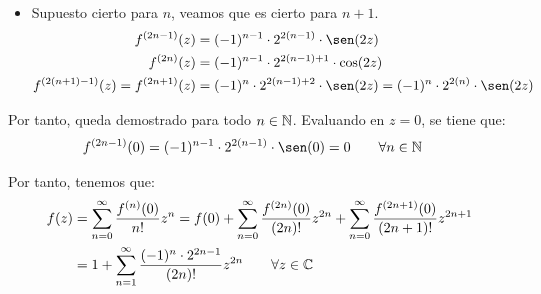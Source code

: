 \begin{ejercicio}
\begin{enumerate}
\begin{itemize}
            \item Supuesto cierto para $n$, veamos que es cierto para $n+1$.
            \begin{align*}
                f^{(2n-1)}(z) &= (-1)^{n-1}\cdot 2^{2(n-1)}\cdot \sen(2z)\\
                f^{(2n)}(z) &= (-1)^{n-1}\cdot 2^{2(n-1)+1}\cdot \cos(2z)\\
                f^{(2(n+1)-1)}(z) = f^{(2n+1)}(z) &= (-1)^{n}\cdot 2^{2(n-1)+2}\cdot \sen(2z) = (-1)^{n}\cdot 2^{2(n)}\cdot \sen(2z)
            \end{align*}
        \end{itemize}

        Por tanto, queda demostrado para todo $n\in \mathbb{N}$. Evaluando en $z=0$, se tiene que:
        \begin{align*}
            f^{(2n-1)}(0) &= (-1)^{n-1}\cdot 2^{2(n-1)}\cdot \sen(0) = 0\qquad \forall n \in \bb{N}
        \end{align*}

        Por tanto, tenemos que:
        \begin{align*}
            f(z) &= \sum_{n=0}^{\infty} \dfrac{f^{(n)}(0)}{n!}z^n
            = f(0) + \sum_{n=0}^{\infty} \dfrac{f^{(2n)}(0)}{(2n)!}z^{2n} + \sum_{n=0}^{\infty} \dfrac{f^{(2n+1)}(0)}{(2n+1)!}z^{2n+1}\\
            &= 1+\sum_{n=1}^{\infty} \dfrac{(-1)^{n}\cdot 2^{2n-1}}{(2n)!}z^{2n}\qquad \forall z \in \mathbb{C}
        \end{align*}
    \end{enumerate}
\end{ejercicio}

